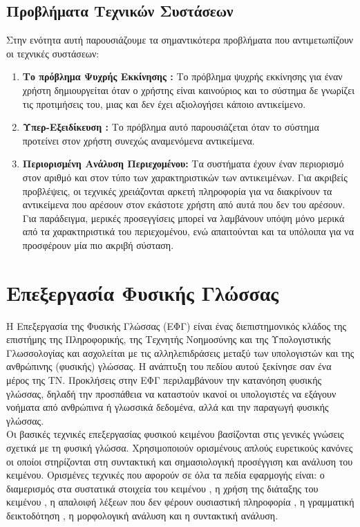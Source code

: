 \subsection{Προβλήματα Τεχνικών Συστάσεων}

Στην ενότητα αυτή παρουσιάζουμε τα σημαντικότερα προβλήματα που αντιμετωπίζουν
οι τεχνικές συστάσεων:

\begin{enumerate}
  \item \textbf{Το πρόβλημα Ψυχρής Εκκίνησης {}:} 
  Το πρόβλημα ψυχρής εκκίνησης για έναν χρήστη δημιουργείται όταν ο χρήστης είναι καινούριος και το σύστημα δε γνωρίζει τις προτιμήσεις του, 
  μιας και δεν έχει αξιολογήσει κάποιο αντικείμενο.
  \item  \textbf{Υπερ-Εξειδίκευση {}:} Το πρόβλημα αυτό παρουσιάζεται όταν το σύστημα προτείνει στον χρήστη συνεχώς αναμενόμενα αντικείμενα.
  \item  \textbf{Περιορισμένη Ανάλυση Περιεχομένου:} 
  Τα {} συστήματα έχουν έναν περιορισμό στον αριθμό και στον τύπο των χαρακτηριστικών των αντικειμένων. 
  Για ακριβείς προβλέψεις, οι {} τεχνικές χρειάζονται αρκετή πληροφορία 
  για να διακρίνουν τα αντικείμενα που αρέσουν στον εκάστοτε χρήστη από αυτά που δεν του αρέσουν. 
  Για παράδειγμα, μερικές προσεγγίσεις μπορεί να λαμβάνουν υπόψη μόνο μερικά από τα χαρακτηριστικά του περιεχομένου, 
  ενώ απαιτούνται και τα υπόλοιπα για να προσφέρουν μία πιο ακριβή σύσταση.
\end{enumerate}

\section{Επεξεργασία Φυσικής Γλώσσας}

Η Επεξεργασία της Φυσικής Γλώσσας (ΕΦΓ) {}
είναι ένας διεπιστημονικός κλάδος της επιστήμης της Πληροφορικής, της Τεχνητής Νοημοσύνης 
και της Υπολογιστικής Γλωσσολογίας και ασχολείται με τις αλληλεπιδράσεις μεταξύ των υπολογιστών και της ανθρώπινης (φυσικής) γλώσσας. 
Η ανάπτυξη του πεδίου αυτού ξεκίνησε σαν ένα μέρος της ΤΝ. 
Προκλήσεις στην ΕΦΓ περιλαμβάνουν την κατανόηση φυσικής γλώσσας, 
δηλαδή την προσπάθεια να καταστούν ικανοί οι υπολογιστές να εξάγουν νοήματα από ανθρώπινα ή γλωσσικά δεδομένα, 
αλλά και την παραγωγή φυσικής γλώσσας. \\

Οι βασικές τεχνικές επεξεργασίας φυσικού κειμένου βασίζονται στις γενικές γνώσεις σχετικά με τη φυσική γλώσσα. 
Χρησιμοποιούν ορισμένους απλούς ευρετικούς κανόνες οι οποίοι στηρίζονται 
στη συντακτική και σημασιολογική προσέγγιση και ανάλυση του κειμένου. 
Ορισμένες τεχνικές που αφορούν σε όλα τα πεδία εφαρμογής είναι: 
ο διαμερισμός στα συστατικά στοιχεία του κειμένου {}, 
η χρήση της διάταξης του κειμένου {},
η απαλοιφή λέξεων που δεν φέρουν ουσιαστική πληροφορία {},
η γραμματική δεικτοδότηση {}, 
η μορφολογική ανάλυση και η συντακτική ανάλυση.

